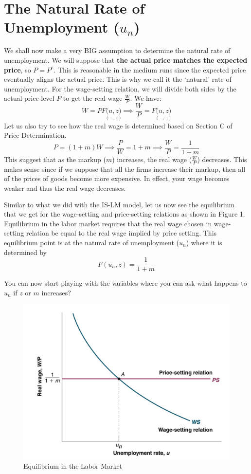 \documentclass{extarticle}
\begin{document}
\section{The Natural Rate of Unemployment ($u_n$)}
We shall now make a very BIG assumption to determine the natural rate of unemployment. We will suppose that \textbf{the actual price matches the expected price}, so $P = P^e$. This is reasonable in the medium runs since the expected price eventually aligns the actual price. This is why we call it the `natural' rate of unemployment. For the wage-setting relation, we will divide both sides by the actual price level $P$ to get the real wage $\frac{W}{P}$. We have:
$$W = P F\underset{(-}{(u}\underset{, +)}{, z)} \implies \frac{W}{P} = F\underset{(-}{(u}\underset{, +)}{, z)}$$
Let us also try to see how the real wage is determined based on Section C of Price Determination.
$$P = (1+m) W \implies \frac{P}{W} = 1+m \implies \frac{W}{P} = \frac{1}{1+m}$$
This suggest that as the markup ($m$) increases, the real wage ($\frac{W}{P}$) decreases. This makes sense since if we suppose that all the firms increase their markup, then all of the prices of goods become more expensive. In effect, your wage becomes weaker and thus the real wage decreases. 

Similar to what we did with the IS-LM model, let us now see the equilibrium that we get for the wage-setting and price-setting relations as shown in Figure 1. 
Equilibrium in the labor market requires that the real wage chosen in wage-setting relation be equal to the real wage implied by price setting. This equilibrium point is at the natural rate of unemployment ($u_n$) where it is determined by $$F(u_n, z) = \frac{1}{1+m}$$

You can now start playing with the variables where you can ask what happens to $u_n$ if $z$ or $m$ increases?
\begin{figure}[h]
    \centering 
    \includegraphics[width=0.5\linewidth]{labor market.png} 
    \caption{Equilibrium in the Labor Market} 
    \label{fig:derivation} 
\end{figure}
\end{document}
